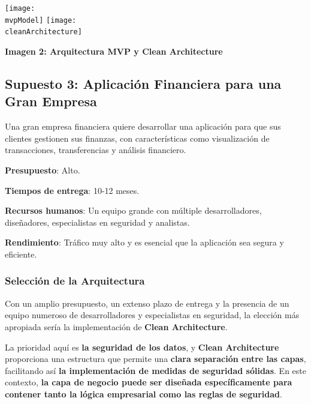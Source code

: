 \documentclass[a4paper]{article}
\newcommand{\cleanArchitecture}{imagenes/cleanArchitecture.png}
\newcommand{\mvpModel}{imagenes/mvp_model.png}
\begin{document}
    \begin{center}
        \texttt{[image: \\mvpModel]}
        \texttt{[image: \\cleanArchitecture]}
        \vspace{0.2cm}\par\textbf{Imagen 2: Arquitectura MVP y Clean Architecture}\label{fig:imagen-captura-estilo-pagina}
    \end{center}
    \newpage
    
    \subsection{Supuesto 3: Aplicación Financiera para una Gran Empresa}

    Una gran empresa financiera quiere desarrollar una aplicación para que sus clientes gestionen sus finanzas, con características como visualización de transacciones, transferencias y análisis financiero.\vspace{0.2cm}
    
    \textbf{Presupuesto}: Alto.\vspace{0.2cm}
    
    \textbf{Tiempos de entrega}: 10-12 meses.\vspace{0.2cm}
    
    \textbf{Recursos humanos}: Un equipo grande con múltiple desarrolladores, diseñadores, especialistas en seguridad y analistas.\vspace{0.2cm}
    
    \textbf{Rendimiento}: Tráfico muy alto y es esencial que la aplicación sea segura y eficiente.\vspace{0.2cm}

    \subsubsection{Selección de la Arquitectura}
    
    Con un amplio presupuesto, un extenso plazo de entrega y la presencia de un equipo numeroso de desarrolladores y especialistas en seguridad, la elección más apropiada sería la implementación de \textbf{Clean Architecture}.\vspace{0.3cm}
    
    La prioridad aquí es \textbf{la seguridad de los datos}, y \textbf{Clean Architecture} proporciona una estructura que permite una \textbf{clara separación entre las capas}, facilitando así \textbf{la implementación de medidas de seguridad sólidas}. En este contexto, \textbf{la capa de negocio puede ser diseñada específicamente para contener tanto la lógica empresarial como las reglas de seguridad}.\vspace{0.3cm}
    
\end{document}
